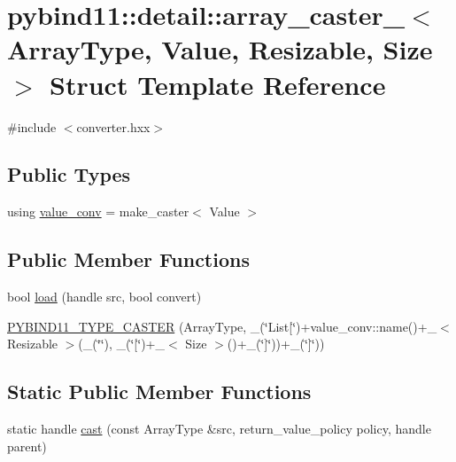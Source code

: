 \hypertarget{structpybind11_1_1detail_1_1array__caster__}{}\section{pybind11\+:\+:detail\+:\+:array\+\_\+caster\+\_\+$<$ Array\+Type, Value, Resizable, Size $>$ Struct Template Reference}
\label{structpybind11_1_1detail_1_1array__caster__}


{\ttfamily \#include $<$converter.\+hxx$>$}

\subsection*{Public Types}
\begin{DoxyCompactItemize}
\item 
using \hyperlink{structpybind11_1_1detail_1_1array__caster___a39e6e57cd2c8ab3c8cc81ee85fcfbcc6}{value\+\_\+conv} = make\+\_\+caster$<$ Value $>$
\end{DoxyCompactItemize}
\subsection*{Public Member Functions}
\begin{DoxyCompactItemize}
\item 
bool \hyperlink{structpybind11_1_1detail_1_1array__caster___a26ad1fb7dab7c82cd832c8c3a356fead}{load} (handle src, bool convert)
\item 
\hyperlink{structpybind11_1_1detail_1_1array__caster___a1feb38428c22749e65c159c0e63b9eb7}{P\+Y\+B\+I\+N\+D11\+\_\+\+T\+Y\+P\+E\+\_\+\+C\+A\+S\+T\+E\+R} (Array\+Type, \+\_\+(\char`\"{}List\mbox{[}\char`\"{})+value\+\_\+conv\+::name()+\+\_\+$<$ Resizable $>$(\+\_\+(\char`\"{}\char`\"{}), \+\_\+(\char`\"{}\mbox{[}\char`\"{})+\+\_\+$<$ Size $>$()+\+\_\+(\char`\"{}\mbox{]}\char`\"{}))+\+\_\+(\char`\"{}\mbox{]}\char`\"{}))
\end{DoxyCompactItemize}
\subsection*{Static Public Member Functions}
\begin{DoxyCompactItemize}
\item 
static handle \hyperlink{structpybind11_1_1detail_1_1array__caster___a5b2accfaf6b0ca00cb250a511d7e037a}{cast} (const Array\+Type \&src, return\+\_\+value\+\_\+policy policy, handle parent)
\end{DoxyCompactItemize}


